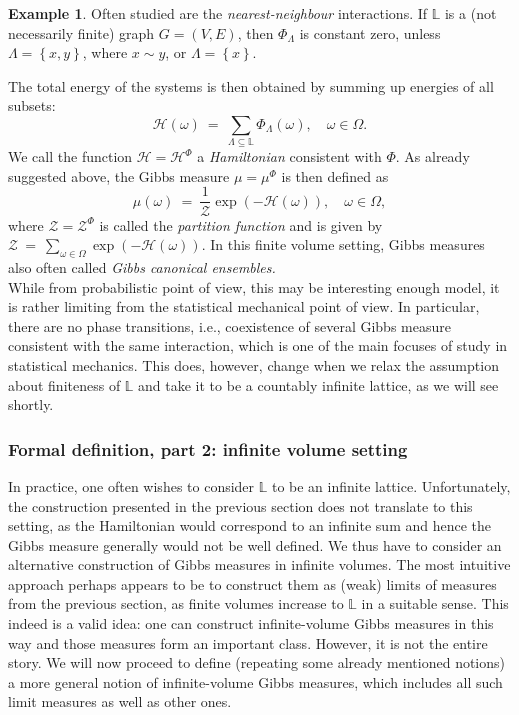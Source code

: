 \documentclass[12pt]{article}
\renewcommand{\H}{\mathcal{H}}
\renewcommand{\L}{\mathbb{L}}
\newcommand{\ZZ}{\mathcal{Z}}
\newcommand{\set}[1]{\left\{#1\right\}}
\newcommand{\1}{\mathbbm{1}}
\newcommand{\5}{\vspace{0.5cm}}
\theoremstyle{definition}
\newtheorem{ex}[thm]{Example}
\begin{document}
\begin{ex}
Often studied are the \textit{nearest-neighbour} interactions. If $\L$ is a (not necessarily finite) graph $G=(V,E)$, then $\Phi_\Lambda$ is constant zero, unless $\Lambda=\set{x,y}$, where $x\sim y$, or $\Lambda=\set{x}$.
\end{ex}

The total energy of the systems is then obtained by summing up energies of all subsets:
$$\H(\omega) ~=~ \sum_{\Lambda\subseteq \L}\Phi_\Lambda(\omega), \quad \omega\in\Omega.$$
We call the function $\H=\H^\Phi$ a \textit{Hamiltonian} consistent with $\Phi$. As already suggested above, the Gibbs measure $\mu=\mu^\Phi$ is then defined as
$$\mu(\omega) ~=~ \frac{1}{\ZZ}\exp(-\H(\omega)), \quad \omega\in\Omega,$$
where $\ZZ=\ZZ^\Phi$ is called the \textit{partition function} and is given by $\ZZ ~=~ \sum_{\omega\in\Omega}\exp(-\H(\omega)).$ In this finite volume setting, Gibbs measures also often called \textit{Gibbs canonical ensembles.} \\

While from probabilistic point of view, this may be interesting enough model, it is rather limiting from the statistical mechanical point of view. In particular, there are no phase transitions, i.e., coexistence of several Gibbs measure consistent with the same interaction, which is one of the main focuses of study in statistical mechanics. This does, however, change when we relax the assumption about finiteness of $\L$ and take it to be a countably infinite lattice, as we will see shortly.


\subsubsection{Formal definition, part 2: infinite volume setting}

In practice, one often wishes to consider $\L$ to be an infinite lattice. Unfortunately, the construction presented in the previous section does not translate to this setting, as the Hamiltonian would correspond to an infinite sum and hence the Gibbs measure generally would not be well defined. We thus have to consider an alternative construction of Gibbs measures in infinite volumes. The most intuitive approach perhaps appears to be to construct them as (weak) limits of measures from the previous section, as finite volumes increase to $\L$ in a suitable sense. This indeed is a valid idea: one can construct infinite-volume Gibbs measures in this way and those measures form an important class. However, it is not the entire story. We will now proceed to define (repeating some already mentioned notions) a more general notion of infinite-volume Gibbs measures, which includes all such limit measures as well as other ones. \\
\end{document}
